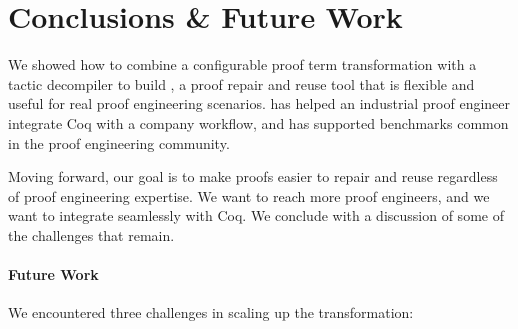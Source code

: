 \section{Conclusions \& Future Work}
\label{sec:discussion}

We showed how to combine a configurable proof term transformation with a tactic decompiler to build \toolname,
a proof repair and reuse tool that is flexible and useful for real proof engineering scenarios.
\toolname has helped an industrial proof engineer integrate Coq with a company workflow,
and has supported benchmarks common in the proof engineering community.

Moving forward, our goal is to make proofs easier to repair and reuse regardless of proof engineering expertise.
We want to reach more proof engineers, and we want \toolname to integrate seamlessly with Coq.
We conclude with a discussion of some of the challenges that remain.


\paragraph{Future Work}

We encountered three challenges in scaling up the \toolname transformation:

